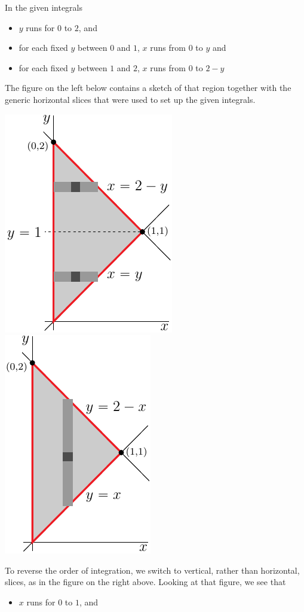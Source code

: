 \begin{solution}
In the given integrals
\begin{itemize}
\item
$y$ runs for $0$ to $2$, and

\item
for each fixed $y$ between $0$ and $1$, $x$ runs from $0$ to $y$
and


\item
for each fixed $y$ between $1$ and $2$, $x$ runs from $0$ to $2-y$
\end{itemize}
The figure on the left below contains a sketch of that region together
with the generic horizontal slices that were used to set up the given
integrals.
\begin{center}
     \includegraphics{fig/OE06A_6h.pdf}\qquad
     \includegraphics{fig/OE06A_6v.pdf}
\end{center}
To reverse the order of integration, we switch to vertical, rather
than horizontal, slices, as in the figure on the right above.
Looking at that figure, we see that 
\begin{itemize}
\item
$x$ runs for $0$ to $1$, and


\end{itemize}
\end{solution}
